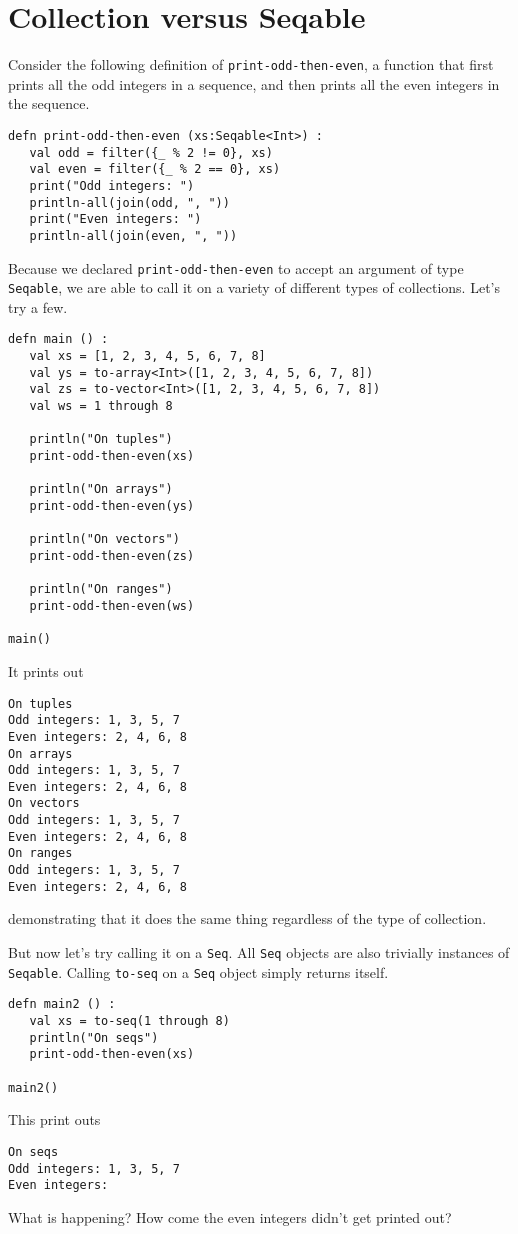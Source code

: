 \documentclass[10pt,oneside]{book}
\begin{document}
\section{Collection versus Seqable}
Consider the following definition of \texttt{\frenchspacing print-odd-then-even}, a function that first prints all the odd integers in a sequence, and then prints all the even integers in the sequence.
\begin{lstlisting}
defn print-odd-then-even (xs:Seqable<Int>) :
   val odd = filter({_ % 2 != 0}, xs)
   val even = filter({_ % 2 == 0}, xs)
   print("Odd integers: ")
   println-all(join(odd, ", "))
   print("Even integers: ")
   println-all(join(even, ", "))
\end{lstlisting}
Because we declared \texttt{\frenchspacing print-odd-then-even} to accept an argument of type \texttt{\frenchspacing Seqable}, we are able to call it on a variety of different types of collections. Let's try a few.
\begin{lstlisting}
defn main () :
   val xs = [1, 2, 3, 4, 5, 6, 7, 8]
   val ys = to-array<Int>([1, 2, 3, 4, 5, 6, 7, 8])
   val zs = to-vector<Int>([1, 2, 3, 4, 5, 6, 7, 8])
   val ws = 1 through 8
   
   println("On tuples")
   print-odd-then-even(xs)

   println("On arrays")
   print-odd-then-even(ys)

   println("On vectors")
   print-odd-then-even(zs)

   println("On ranges")
   print-odd-then-even(ws)

main()   
\end{lstlisting}
It prints out
\begin{lstlisting}
On tuples
Odd integers: 1, 3, 5, 7
Even integers: 2, 4, 6, 8
On arrays
Odd integers: 1, 3, 5, 7
Even integers: 2, 4, 6, 8
On vectors
Odd integers: 1, 3, 5, 7
Even integers: 2, 4, 6, 8
On ranges
Odd integers: 1, 3, 5, 7
Even integers: 2, 4, 6, 8
\end{lstlisting}
demonstrating that it does the same thing regardless of the type of collection. 

But now let's try calling it on a \texttt{\frenchspacing Seq}. All \texttt{\frenchspacing Seq} objects are also trivially instances of \texttt{\frenchspacing Seqable}. Calling \texttt{\frenchspacing to-seq} on a \texttt{\frenchspacing Seq} object simply returns itself. 
\begin{lstlisting}
defn main2 () :
   val xs = to-seq(1 through 8)
   println("On seqs")
   print-odd-then-even(xs)

main2()
\end{lstlisting}
This print outs
\begin{lstlisting}
On seqs
Odd integers: 1, 3, 5, 7
Even integers: 
\end{lstlisting}
What is happening? How come the even integers didn't get printed out? 
\end{document}
